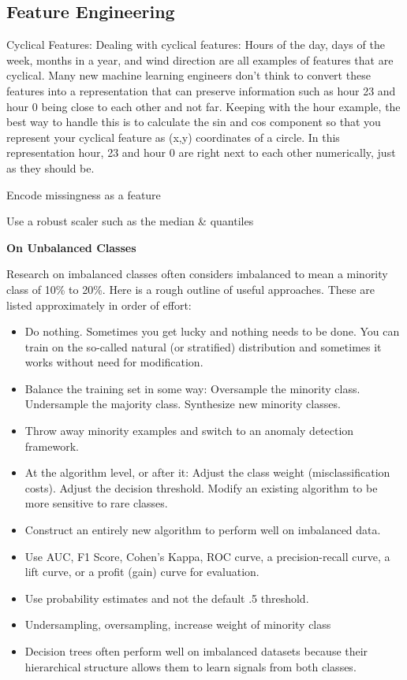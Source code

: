 \documentclass[]{book}
\begin{document}
\hypertarget{feature-engineering}{%
\subsection{Feature Engineering}\label{feature-engineering}}

Cyclical Features: Dealing with cyclical features: Hours of the day, days of the week, months in a year, and wind direction are all examples of features that are cyclical. Many new machine learning engineers don't think to convert these features into a representation that can preserve information such as hour 23 and hour 0 being close to each other and not far. Keeping with the hour example, the best way to handle this is to calculate the sin and cos component so that you represent your cyclical feature as (x,y) coordinates of a circle. In this representation hour, 23 and hour 0 are right next to each other numerically, just as they should be.

Encode missingness as a feature

Use a robust scaler such as the median \& quantiles

\textbf{On Unbalanced Classes}

Research on imbalanced classes often considers imbalanced to mean a minority class of 10\% to 20\%. Here is a rough outline of useful approaches. These are listed approximately in order of effort:

\begin{itemize}
\item
  Do nothing. Sometimes you get lucky and nothing needs to be done. You can train on the so-called natural (or stratified) distribution and sometimes it works without need for modification.
\item
  Balance the training set in some way: Oversample the minority class. Undersample the majority class.
  Synthesize new minority classes.
\item
  Throw away minority examples and switch to an anomaly detection framework.
\item
  At the algorithm level, or after it: Adjust the class weight (misclassification costs). Adjust the decision threshold. Modify an existing algorithm to be more sensitive to rare classes.
\item
  Construct an entirely new algorithm to perform well on imbalanced data.
\item
  Use AUC, F1 Score, Cohen's Kappa, ROC curve, a precision-recall curve, a lift curve, or a profit (gain) curve for evaluation.
\item
  Use probability estimates and not the default .5 threshold.
\item
  Undersampling, oversampling, increase weight of minority class
\item
  Decision trees often perform well on imbalanced datasets because their hierarchical structure allows them to learn signals from both classes.
\end{itemize}
\end{document}
